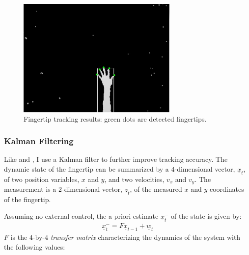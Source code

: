 \begin{figure}[tbh]
\centering
\includegraphics[width=0.7\textwidth]{figures/five_fingers.PNG}
\caption{Fingertip tracking results: green dots are detected fingertips.}
\label{fig:five-finger}
\end{figure}

\subsubsection{Kalman Filtering}
Like \cite{Oka02} and \cite{harrison11}, I use a Kalman filter to further
improve tracking accuracy. The dynamic state
of the fingertip can be summarized by a $4$-dimensional vector,
$\underline{x}_t$, of two position variables, $x$ and $y$, and two velocities,
$v_x$ and $v_y$. The measurement is a $2$-dimensional vector, $\underline{z}_t$,
of the measured $x$ and $y$ coordinates of the fingertip.

Assuming no external control, the a priori estimate $\underline{x}_t^-$ of the
state is given by:
\begin{align*}
\underline{x}_t^- = F\underline{x}_{t - 1} + \underline{w}_t
\end{align*}
$F$ is the $4$-by-$4$ \textit{transfer matrix} characterizing the
dynamics of the system with the following values:

